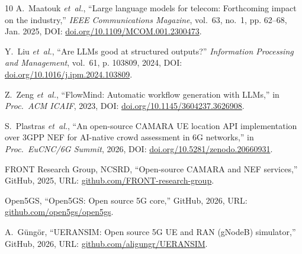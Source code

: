 \documentclass[conference]{IEEEtran}
\begin{document}
{\begin{thebibliography}{10}
A.~Maatouk \emph{et~al.}, ``Large language models for telecom: Forthcoming
  impact on the industry,'' \emph{IEEE Communications Magazine}, vol.~63,
  no.~1, pp. 62--68, Jan. 2025, {DOI}:
  \href{https://doi.org/10.1109/MCOM.001.2300473}{doi.org/10.1109/MCOM.001.2300473}.

Y.~Liu \emph{et~al.}, ``Are {LLM}s good at structured outputs?''
  \emph{Information Processing and Management}, vol.~61, p. 103809, 2024,
  {DOI}:
  \href{https://doi.org/10.1016/j.ipm.2024.103809}{doi.org/10.1016/j.ipm.2024.103809}.

Z.~Zeng \emph{et~al.}, ``{FlowMind}: Automatic workflow generation with
  {LLM}s,'' in \emph{Proc.\ ACM ICAIF}, 2023, {DOI}:
  \href{https://doi.org/10.1145/3604237.3626908}{doi.org/10.1145/3604237.3626908}.

S.~Plastras \emph{et~al.}, ``An open-source {CAMARA} {UE} location {API}
  implementation over {3GPP} {NEF} for {AI}-native crowd assessment in {6G}
  networks,'' in \emph{Proc.\ EuCNC/6G Summit}, 2026, {DOI}:
  \href{https://doi.org/10.5281/zenodo.20660931}{doi.org/10.5281/zenodo.20660931}.

{FRONT Research Group, NCSRD}, ``Open-source {CAMARA} and {NEF} services,''
  GitHub, 2025, {URL}:
  \href{https://github.com/FRONT-research-group}{github.com/FRONT-research-group}.

{Open5GS}, ``Open5{GS}: Open source {5G} core,'' GitHub, 2026, {URL}:
  \href{https://github.com/open5gs/open5gs}{github.com/open5gs/open5gs}.

A.~G\"{u}ng\"{o}r, ``{UERANSIM}: Open source {5G} {UE} and {RAN} ({gNodeB})
  simulator,'' GitHub, 2026, {URL}:
  \href{https://github.com/aligungr/UERANSIM}{github.com/aligungr/UERANSIM}.

\end{thebibliography}
}
\end{document}
